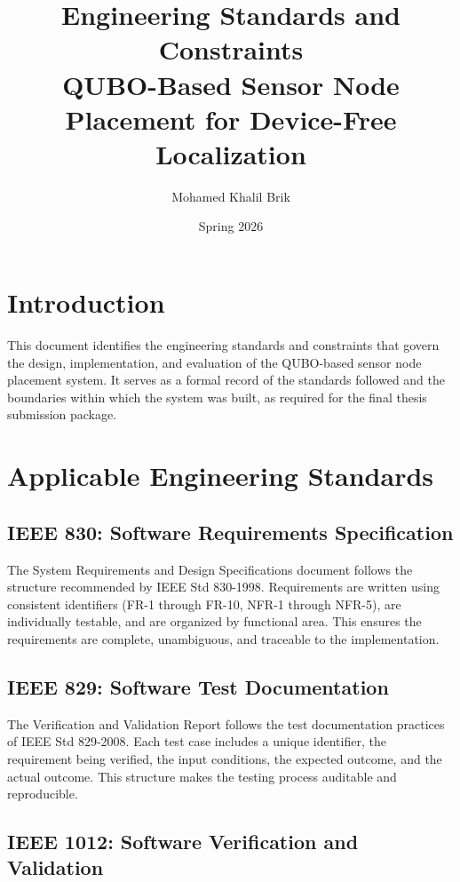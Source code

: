 \documentclass[12pt,a4paper]{article}
\title{
    \textbf{Engineering Standards and Constraints} \\[0.5em]
    \large QUBO-Based Sensor Node Placement for Device-Free Localization
}
\author{Mohamed Khalil Brik}
\date{Spring 2026}
\begin{document}
\maketitle
\tableofcontents
\newpage

\section{Introduction}

This document identifies the engineering standards and constraints that
govern the design, implementation, and evaluation of the QUBO-based sensor
node placement system. It serves as a formal record of the standards followed
and the boundaries within which the system was built, as required for the
final thesis submission package.

\section{Applicable Engineering Standards}

\subsection{IEEE 830: Software Requirements Specification}

The System Requirements and Design Specifications document follows the
structure recommended by IEEE Std 830-1998. Requirements are written using
consistent identifiers (FR-1 through FR-10, NFR-1 through NFR-5), are
individually testable, and are organized by functional area. This ensures
the requirements are complete, unambiguous, and traceable to the
implementation.

\subsection{IEEE 829: Software Test Documentation}

The Verification and Validation Report follows the test documentation
practices of IEEE Std 829-2008. Each test case includes a unique identifier,
the requirement being verified, the input conditions, the expected outcome,
and the actual outcome. This structure makes the testing process auditable
and reproducible.

\subsection{IEEE 1012: Software Verification and Validation}
\end{document}
